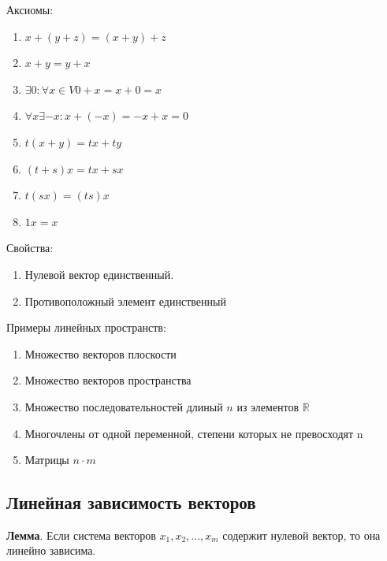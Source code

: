 \documentclass[a4paper]{article}
\begin{document}
    Аксиомы:
    \begin{enumerate}
        \item $x+(y+z) = (x+y)+z$
        \item $x+y=y+x$
        \item $\exists 0: \forall x \in V 0 + x = x + 0 = x$
        \item $\forall x \exists -x: x + (-x) = -x + x = 0$
        \item $t(x+y) = tx + ty$
        \item $(t+s)x = tx + sx$
        \item $t(sx) = (ts)x$
        \item $1x = x$
    \end{enumerate}


    Свойства:
    \begin{enumerate}
        \item Нулевой вектор единственный.
        \item Противоположный элемент единственный
    \end{enumerate}

    Примеры линейных пространств:
    \begin{enumerate}
        \item Множество векторов плоскости
        \item Множество векторов пространства
        \item Множество последовательностей длиный $n$ из элементов $\mathbb{R}$
        \item Многочлены от одной переменной, степени которых не превосходят n
        \item Матрицы $n \cdot m$
    \end{enumerate}

    \newpage \begin{center}
                 \begin{Large}
                 \end{Large}
    \end{center}
    \subsection*{Линейная зависимость векторов}
    \begin{htheorem}
        \textbf{Лемма}. Если система векторов $x_1, x_2, ..., x_m$ содержит нулевой вектор, то она линейно зависима.
    \end{htheorem}
\end{document}
